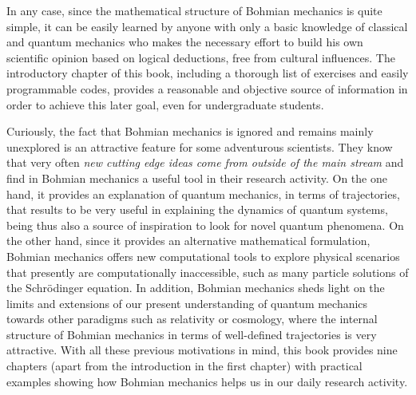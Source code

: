 \documentclass[nofootinbib, secnumarabic, amsmath, nobibnotes,11pt,aps,pra, floatfix]{revtex4-1}
\begin{document}
In any case, since the mathematical structure of Bohmian mechanics is quite simple, it can be easily learned by anyone with only a basic knowledge of classical and quantum mechanics who makes the necessary effort to build his own scientific opinion based on logical deductions, free from cultural influences. The introductory chapter of this book, including a thorough list of exercises and easily programmable codes, provides a reasonable and objective source of information in order to achieve this later goal, even for undergraduate students.

Curiously, the fact that Bohmian mechanics is ignored and remains mainly unexplored is an attractive feature for some adventurous scientists. They know that very often \emph{new cutting edge ideas come from outside of the main stream} and find in Bohmian mechanics a useful tool in their research activity. On the one hand, it provides an explanation of quantum mechanics, in terms of trajectories, that results to be very useful in explaining the dynamics of quantum systems, being thus also a source of inspiration to look for novel quantum phenomena. On the other hand, since it provides an alternative mathematical formulation, Bohmian mechanics offers new computational tools to explore physical scenarios that presently are computationally inaccessible, such as many particle solutions of the Schr\"odinger equation. In addition, Bohmian mechanics sheds light on the limits and extensions of our present understanding of quantum mechanics towards other paradigms such as relativity or cosmology, where the internal structure of Bohmian mechanics in terms of well-defined trajectories is very attractive. With all these previous motivations in mind, this book provides nine chapters (apart from the introduction in the first chapter) with practical examples showing how Bohmian mechanics helps us in our daily research activity.
\end{document}

